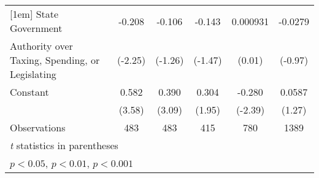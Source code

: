 {\begin{tabular}{l*{5}{c}}
[1em]
State Government    &      -0.208\sym{*}  &      -0.106         &      -0.143         &    0.000931         &     -0.0279         \\
Authority over Taxing, Spending, or Legislating&     (-2.25)         &     (-1.26)         &     (-1.47)         &      (0.01)         &     (-0.97)         \\
[1em]
Constant            &       0.582\sym{***}&       0.390\sym{**} &       0.304         &      -0.280\sym{*}  &      0.0587         \\
                    &      (3.58)         &      (3.09)         &      (1.95)         &     (-2.39)         &      (1.27)         \\
\hline
Observations        &         483         &         483         &         415         &         780         &        1389         \\
\hline\hline
\multicolumn{6}{l}{\footnotesize \textit{t} statistics in parentheses}\\
\multicolumn{6}{l}{\footnotesize \sym{*} \(p<0.05\), \sym{**} \(p<0.01\), \sym{***} \(p<0.001\)}\\
\end{tabular}
}
